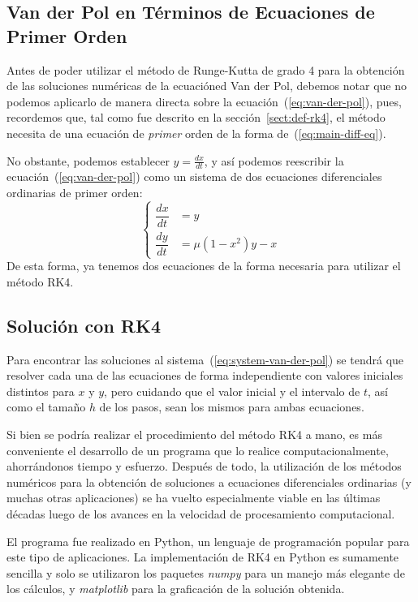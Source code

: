 \documentclass[12pt, a4paper]{article}
\begin{document}
\subsection{Van der Pol en Términos de Ecuaciones de Primer Orden}

Antes de poder utilizar el método de Runge-Kutta de grado 4 para la obtención de las soluciones numéricas de la ecuacióned Van der Pol, debemos notar que no podemos aplicarlo de manera directa sobre la ecuación~(\ref{eq:van-der-pol}), pues, recordemos que, tal como fue descrito en la sección~\ref{sect:def-rk4}, el método necesita de una ecuación de \textit{primer} orden de la forma de~(\ref{eq:main-diff-eq}).

No obstante, podemos establecer \(y = \frac{dx}{dt}\), y así podemos reescribir la ecuación~(\ref{eq:van-der-pol}) como un sistema de dos ecuaciones diferenciales ordinarias de primer orden:
\begin{equation} \label{eq:system-van-der-pol}
	\begin{cases}
		\dfrac{dx}{dt} &= y \\[1em]
		\dfrac{dy}{dt} &= \mu(1 - x^{2})y - x
	\end{cases}
\end{equation}
De esta forma, ya tenemos dos ecuaciones de la forma necesaria para utilizar el método RK4.

\subsection{Solución con RK4}

Para encontrar las soluciones al sistema~(\ref{eq:system-van-der-pol}) se tendrá que resolver cada una de las ecuaciones de forma independiente con valores iniciales distintos para \(x\) y \(y\), pero cuidando que el valor inicial y el intervalo de \(t\), así como el tamaño \(h\) de los pasos, sean los mismos para ambas ecuaciones.

Si bien se podría realizar el procedimiento del método RK4 a mano, es más conveniente el desarrollo de un programa que lo realice computacionalmente, ahorrándonos tiempo y esfuerzo. Después de todo, la utilización de los métodos numéricos para la obtención de soluciones a ecuaciones diferenciales ordinarias (y muchas otras aplicaciones) se ha vuelto especialmente viable en las últimas décadas luego de los avances en la velocidad de procesamiento computacional.

El programa fue realizado en Python, un lenguaje de programación popular para este tipo de aplicaciones. La implementación de RK4 en Python es sumamente sencilla y solo se utilizaron los paquetes \textit{numpy} para un manejo más elegante de los cálculos, y \textit{matplotlib} para la graficación de la solución obtenida.
\end{document}
